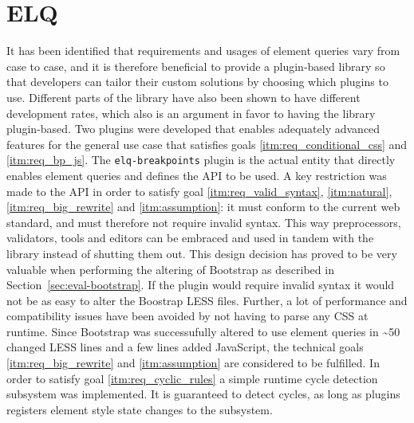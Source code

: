 \documentclass[a4paper,11pt]{kth-mag}
\newcommand{\code}[1]{\texttt{#1}}
\begin{document}
    \section{ELQ}
    It has been identified that requirements and usages of element queries vary from case to case, and it is therefore beneficial to provide a plugin-based library so that developers can tailor their custom solutions by choosing which plugins to use.
    Different parts of the library have also been shown to have different development rates, which also is an argument in favor to having the library plugin-based.
    Two plugins were developed that enables adequately advanced features for the general use case that satisfies goals \ref{itm:req_conditional_css} and \ref{itm:req_bp_js}.
    The \code{elq-breakpoints} plugin is the actual entity that directly enables element queries and defines the \gls{API} to be used.
    A key restriction was made to the \gls{API} in order to satisfy goal \ref{itm:req_valid_syntax}, \ref{itm:natural}, \ref{itm:req_big_rewrite} and \ref{itm:assumption}: it must conform to the current web standard, and must therefore not require invalid syntax.
    This way preprocessors, validators, tools and editors can be embraced and used in tandem with the library instead of shutting them out.
    This design decision has proved to be very valuable when performing the altering of Bootstrap as described in Section~\ref{sec:eval-bootstrap}.
    If the plugin would require invalid syntax it would not be as easy to alter the Boostrap \gls{LESS} files.
    Further, a lot of performance and compatibility issues have been avoided by not having to parse any \gls{CSS} at runtime.
    Since Bootstrap was successufully altered to use element queries in \textasciitilde50 changed \gls{LESS} lines and a few lines added JavaScript, the technical goals \ref{itm:req_big_rewrite} and \ref{itm:assumption} are considered to be fulfilled.
    In order to satisfy goal \ref{itm:req_cyclic_rules} a simple runtime cycle detection subsystem was implemented.
    It is guaranteed to detect cycles, as long as plugins registers element style state changes to the subsystem.
    
\end{document}
